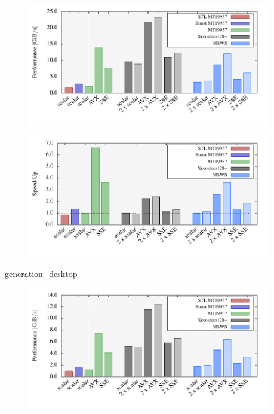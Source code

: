 \documentclass{stdlocal}
\begin{document}
    \begin{figure}
      \center
      \includegraphics[width=0.95\textwidth]{plots/generation_desktop.pdf}
      \caption{}
    \end{figure}

    \begin{figure}
      \center
      \includegraphics[width=0.95\textwidth]{plots/generation_desktop_speedup.pdf}
      \caption{}
    \end{figure}

    \begin{table}
      \caption{}
      \footnotesize
      \renewcommand{\arraystretch}{1.2}
      {generation_desktop}
    \end{table}

    \begin{figure}
      \center
      \includegraphics[width=0.95\textwidth]{plots/generation_laptop.pdf}
      \caption{}
    \end{figure}
\end{document}
